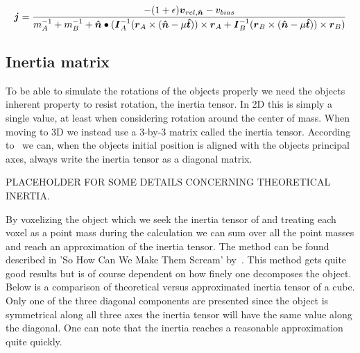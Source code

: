 \begin{equation}\label{eq:finalJ}
  \boldsymbol{j} = \frac{-(1+\epsilon)\boldsymbol{v}_{rel,\boldsymbol{\hat{n}}}-v_{bias}}
  {m_A^{-1}+m_B^{-1}+\boldsymbol{\hat{n}}\bullet(\boldsymbol{I}_A^{-1}(\boldsymbol{r}_A\times(\boldsymbol{\hat{n}}-\mu\boldsymbol{\hat{t}}))\times\boldsymbol{r}_A
  +\boldsymbol{I}_B^{-1}(\boldsymbol{r}_B\times(\boldsymbol{\hat{n}}-\mu\boldsymbol{\hat{t}}))\times\boldsymbol{r}_B)}
\end{equation}
%

\subsection{Inertia matrix}
To be able to simulate the rotations of the objects properly we need the objects
inherent property to resist rotation, the inertia tensor.
In 2D this is simply a single value, at least when considering rotation around
the center of mass. When moving to 3D we instead use a 3-by-3 matrix called the
inertia tensor. According to~\cite{ragnemalmscream} we can, when the objects initial
position is aligned with the objects principal axes, always write the inertia tensor
as a diagonal matrix.

PLACEHOLDER FOR SOME DETAILS CONCERNING THEORETICAL INERTIA.

By voxelizing the object which we seek the inertia tensor of and treating each voxel
as a point mass during the calculation we can sum over all the point masses and reach
an approximation of the inertia tensor. The method can be found described in
 'So How Can We Make Them Scream' by~\cite{ragnemalmscream}. This method gets quite
 good results but is of course dependent on how finely one decomposes the object.
 Below is a comparison of theoretical versus approximated inertia tensor of a cube.
 Only one of the three diagonal components are presented since the object is symmetrical
 along all three axes the inertia tensor will have the same value along the diagonal.
 One can note that the inertia reaches a reasonable approximation quite quickly.

